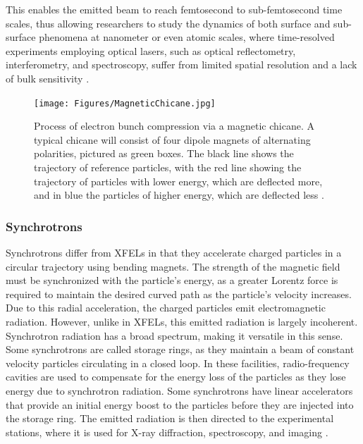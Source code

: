 \documentclass[aps,prb,twocolumn,superscriptaddress]{revtex4-2}
\begin{document}
This enables the emitted beam to reach femtosecond to sub-femtosecond 
time scales, thus allowing researchers to study the dynamics of both surface and
sub-surface phenomena at nanometer or even atomic scales, where time-resolved
experiments employing optical lasers, such as optical reflectometry,
interferometry, and spectroscopy, suffer from limited spatial resolution and a
lack of bulk sensitivity
\cite{randolph2024subpicosecondsurfacecorrelationsfemtosecond}.

\begin{figure}[h]
    \centering
    \texttt{[image: Figures/MagneticChicane.jpg]}
    \caption{Process of electron bunch compression via a magnetic chicane.
    A typical chicane will consist of four dipole magnets of alternating
    polarities, pictured as green boxes. The black line shows the trajectory of
    reference particles, with the red line showing the trajectory of particles
    with lower energy, which are deflected more, and in blue the particles of
    higher energy, which are deflected less \cite{Hastings2020}.}
    \label{fig:Undulator}
\end{figure}

\subsubsection{Synchrotrons}
Synchrotrons differ from XFELs in that they accelerate charged particles in a
circular trajectory using bending magnets. The strength of the magnetic field
must be synchronized with the particle's energy, as a greater Lorentz force is
required to maintain the desired curved path as the particle's velocity
increases. Due to this radial acceleration, the charged particles emit
electromagnetic radiation. However, unlike in XFELs, this emitted radiation is
largely incoherent. Synchrotron radiation has a broad spectrum, making it 
versatile in this sense. Some synchrotrons are called storage rings, as they
maintain a beam of constant velocity particles circulating in a closed loop. 
In these facilities, radio-frequency cavities are used to compensate for the 
energy loss of the particles as they lose energy due to synchrotron radiation. 
Some synchrotrons have linear accelerators that provide an initial energy boost
to the particles before they are injected into the storage ring.
The emitted radiation is then directed to the experimental stations, where it is
used for X-ray diffraction, spectroscopy, and imaging \cite{Wiedemann2004}.
\end{document}
